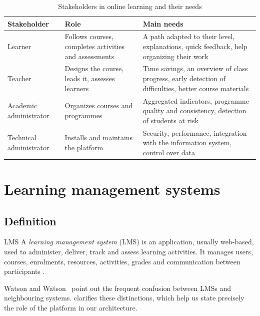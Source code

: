 \begin{table}[htbp]
\centering
\caption{Stakeholders in online learning and their needs}
\label{tab-stakeholders}
\begin{tabularx}{\textwidth}{@{}L{2.8cm}YY@{}}
\toprule
\textbf{Stakeholder} & \textbf{Role} & \textbf{Main needs} \\
\midrule
Learner & Follows courses, completes activities and assessments &
  A path adapted to their level, explanations, quick feedback, help
  organizing their work \\
Teacher & Designs the course, leads it, assesses learners &
  Time savings, an overview of class progress, early detection of
  difficulties, better course materials \\
Academic administrator & Organizes courses and programmes &
  Aggregated indicators, programme quality and consistency, detection of
  students at risk \\
Technical administrator & Installs and maintains the platform &
  Security, performance, integration with the information system,
  control over data \\
\bottomrule
\end{tabularx}
\end{table}

\section{Learning management systems}
\label{sec-lms}

\subsection{Definition}

\begin{definitionbox}{LMS}
A \emph{learning management system} (LMS) is an application, usually
web-based, used to administer, deliver, track and assess learning
activities. It manages users, courses, enrolments, resources, activities,
grades and communication between participants \cite{watson2007,ellis2009}.
\end{definitionbox}

Watson and Watson~\cite{watson2007} point out the frequent confusion
between LMSs and neighbouring systems.  clarifies
these distinctions, which help us state precisely the role of the platform
in our architecture.

